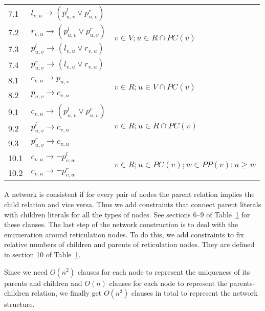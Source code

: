 \documentclass[runningheads, envcountsame, a4paper]{llncs}
\begin{document}
\begin{table}[t]
\begin{tabular}{l | l | l}
  \hline
  7.1 &
  $l_{v,u} \rightarrow (p^l_{u,v} \vee p^r_{u,v})$ &
  \multirow{4}{*}{$v \in V; u \in R \cap PC(v)$}
  \\
  7.2 &
  $r_{v,u} \rightarrow (p^l_{u,v} \vee p^r_{u,v})$ &
  \\
  7.3 &
  $p^l_{u,v} \rightarrow (l_{v,u} \vee r_{v,u})$ &
  \\
  7.4 &
  $p^r_{u,v} \rightarrow (l_{v,u} \vee r_{v,u})$ &
  \\
  
  \hline 
  8.1 &
  $c_{v,u} \rightarrow p_{u,v}$ &
  \multirow{2}{*}{$v \in R; u \in V \cap PC(v)$}
  \\
  8.2 &
  $p_{u,v} \rightarrow c_{v,u}$ &
  \\
  
  \hline
  9.1 &
  $c_{v,u} \rightarrow (p^l_{u,v} \vee p^r_{u,v})$ &
  \multirow{3}{*}{$v \in R; u \in R \cap PC(v)$}
  \\
  9.2 &
  $p^l_{u,v} \rightarrow c_{v,u}$ &
  \\
  9.3 &
  $p^r_{u,v} \rightarrow c_{v,u}$ &
  \\
  
  \hline
  10.1\quad &
  $c_{v,u} \rightarrow \neg p^l_{v,w}$ &
  \multirow{2}{*}{$v \in R; u \in PC(v); w \in PP(v): u \geq w$}
  \\
  10.2 &
  $c_{v,u} \rightarrow \neg p^r_{v,w}$ &
  \\
  
\end{tabular}
\label{network-table}
\end{table}

A network is consistent if for every pair of nodes the parent relation implies the child relation and vice versa. Thus we add constraints that connect parent literals with children literals for all the types of nodes. See sections 6--9 of Table~\ref{network-table} for these clauses.
The last step of the network construction is to deal with the enumeration around reticulation nodes. To do this, we add constraints to fix 
relative numbers of children and parents of reticulation nodes. They are defined in section 10 of Table~\ref{network-table}.

Since we need $O(n^2)$ clauses for each node to represent the uniqueness of its parents and children 
and $O(n)$ clauses for each node to represent the parents-children relation, we finally get $O(n^3)$ clauses in total 
to represent the network structure.
\end{document}
